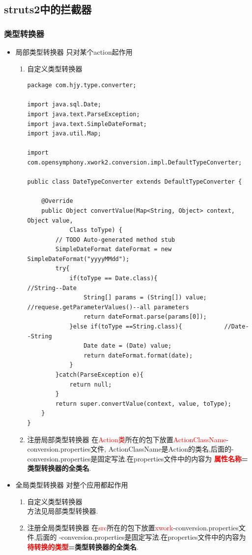 \subsection{struts2中的拦截器}
\subsubsection{类型转换器}
\begin{itemize}
\item 局部类型转换器	只对某个action起作用
\begin{enumerate}
\item 自定义类型转换器
\begin{lstlisting}[style=JAVA]
package com.hjy.type.converter;

import java.sql.Date;
import java.text.ParseException;
import java.text.SimpleDateFormat;
import java.util.Map;

import com.opensymphony.xwork2.conversion.impl.DefaultTypeConverter;

public class DateTypeConverter extends DefaultTypeConverter {

	@Override
	public Object convertValue(Map<String, Object> context, Object value,
			Class toType) {
		// TODO Auto-generated method stub
		SimpleDateFormat dateFormat = new SimpleDateFormat("yyyyMMdd");
		try{
			if(toType == Date.class){					//String--Date
				String[] params = (String[]) value;		//requese.getParameterValues()--all parameters
				return dateFormat.parse(params[0]);
			}else if(toType ==String.class){			//Date--String
				Date date = (Date) value;
				return dateFormat.format(date);
			}
		}catch(ParseException e){
			return null;
		}
		return super.convertValue(context, value, toType);
	}
}
\end{lstlisting}

\item 注册局部类型转换器
在\textcolor{red}{Action类}所在的包下放置\textcolor{red}{ActionClassName}-conversion.properties文件,
ActionClassName是Action的类名,后面的-conversion.properties是固定写法.在properties文件中的内容为
\textbf{\textcolor{red}{属性名称}=类型转换器的全类名}.
\end{enumerate}

\item 全局类型转换器	对整个应用都起作用
\begin{enumerate}
\item 自定义类型转换器\\
方法见局部类型转换器.


\item 注册全局类型转换器
在\textcolor{red}{src}所在的包下放置\textcolor{red}{xwork}-conversion.properties文件,后面的
-conversion.properties是固定写法.在properties文件中的内容为\textbf{\textcolor{red}{待转换的类型}=类型转换器的全类名}.
\end{enumerate}
\end{itemize}



